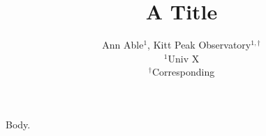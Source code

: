 \documentclass{article}
\begin{document}
\title{A Title}
\author{Ann Able$^{1}$, Kitt Peak Observatory$^{1,\dagger}$\\ $^1$Univ X\\ $^\dagger$Corresponding}
\maketitle
Body.
\end{document}
